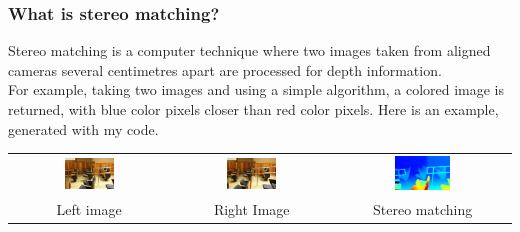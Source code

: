 \documentclass[19pt]{beamer}
\begin{document}
\begin{frame}
\frametitle{What is stereo matching?}

Stereo matching is a computer technique where two images taken from aligned cameras several centimetres apart are processed for depth information. \\[10pt]
%
For example, taking two images and using a simple algorithm, a colored image is returned, with blue color pixels closer than red color pixels. Here is an example, generated with my code.\\[20pt]

\centering
\setlength{}
\begin{tabular}{ccc}
\includegraphics[width=0.33\textwidth]{images/im0-600.jpg} &
\includegraphics[width=0.33\textwidth]{images/im1-600.jpg} &
\includegraphics[width=0.33\textwidth]{images/disp-600.jpg} \\[2pt]
Left image & Right Image & Stereo matching \\
\end{tabular}

\end{frame}
\end{document}
